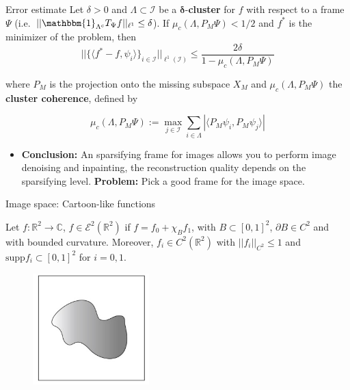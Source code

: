 \begin{frame}
\begin{block}{Error estimate}
Let $\delta>0$ and $\Lambda\subset \mathcal{I}$ be a $\mathbf{\delta}$-\textbf{cluster} for $f$ with respect to a frame $\Psi$ (i.e.\ $||\mathbbm{1}_{\Lambda^c}T_{\Psi}f||_{\ell^1}\leq \delta$). If $\mu_c(\Lambda, P_M\Psi)<1/2$ and $f^*$ is the minimizer of the problem, then
$$
||\{\langle f^*-f,\psi_i\rangle\}_{i\in\mathcal{I}}||_{\ell^1(\mathcal{I})}\leq \frac{2\delta}{1-\mu_c(\Lambda,P_M\Psi)}
$$

\medskip
where $P_M$ is the projection onto the missing subspace $X_M$ and $\mu_c(\Lambda,P_M\Psi)$ the \textbf{cluster coherence}, defined by

\medskip
$$
\mu_c(\Lambda,P_M\Psi) :=\max_{j\in\mathcal{I}} \sum_{i\in \Lambda} |\langle P_M\psi_i,P_M\psi_j\rangle|
$$
\end{block}

\pause
\medskip

\begin{itemize}
\item \textbf{Conclusion:} An sparsifying frame for images allows you to perform image denoising and inpainting, the reconstruction quality depends on the sparsifying level. \textbf{Problem:} Pick a good frame for the image space.
\end{itemize}
\end{frame} 

\begin{frame}{Image space: Cartoon-like functions}
\begin{definition}
Let $f:\mathbb{R}^2\longrightarrow\mathbb{C}$, $f\in\mathcal{E}^2(\mathbb{R}^2)$ if $f= f_0+\chi_B f_1$, with $B\subset [0,1]^2$, $\partial B\in C^2$ and with bounded curvature. Moreover, $f_i\in C^2(\mathbb{R}^2)$ with $||f_i||_{C^2}\leq 1$ and $\text{supp} f_i\subset [0,1]^2$ for $i=0,1$. 
\end{definition}
\pause
\begin{figure}[h!]
\centering
\includegraphics[width=0.4\textwidth]{./Images/cartoon-like.jpg}
\end{figure}
\end{frame}

